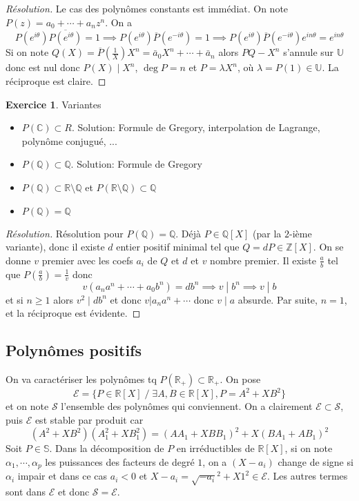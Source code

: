 \documentclass{article}
\theoremstyle{definition}
\newtheorem*{exo}{Exercice}
\begin{document}
\begin{proof}[Résolution]
    Le cas des polynômes constants est immédiat. On note $P(z)=a_0+\cdots +a_nz^n$. On a \[
        P(e^{i\theta})\overline{P(e^{i\theta})}=1\implies P(e^{i\theta})\overline P(e^{-i\theta})=1 \implies P(e^{i\theta})\overline P(e^{-i\theta})e^{in\theta}=e^{in\theta}
    \]
    Si on note $Q(X)=\overline P\left(\frac1X\right)X^n=\bar a_0X^n+\cdots +\bar a_n$ alors $PQ-X^n$ s'annule sur $\mathbb U$ donc est nul donc $P(X)\;|\;X^n$, $\deg P=n$ et $P=\lambda X^n$, où $\lambda=P(1)\in\mathbb U$. La réciproque est claire.
\end{proof}

\begin{exo}
    Variantes \begin{itemize}
        \item $P(\mathbb C)\subset R$. Solution: Formule de Gregory, interpolation de Lagrange, polynôme conjugué, ...
        \item $P(\mathbb Q)\subset \mathbb Q$. Solution: Formule de Gregory
        \item $P(\mathbb Q)\subset \mathbb R\setminus \mathbb Q$ et $P(\mathbb R\setminus \mathbb Q)\subset \mathbb Q$
        \item $P(\mathbb Q)=\mathbb Q$
    \end{itemize}
\end{exo}

\begin{proof}[Résolution]
    Résolution pour $P(\mathbb Q)=\mathbb Q$. Déjà $P\in\mathbb Q[X]$ (par la $2$-ième variante), donc il existe $d$ entier positif minimal tel que $Q=dP\in\mathbb Z[X]$. On se donne $v$ premier avec les coefs $a_i$ de $Q$ et $d$ et $v$ nombre premier. Il existe $\frac ab$ tel que $P(\frac ab)=\frac1v$ donc \[
        v(a_na^n+\cdots +a_0b^n)=db^n \implies v\;|\; b^n\implies v\;|\; b
    \]
    et si $n\geq 1$ alors $v^2\;|\;db^n$ et donc $v|a_na^n+\cdots$ donc $v\;|\;a$ absurde. Par suite, $n=1$, et la réciproque est évidente.
\end{proof}

\subsection{Polynômes positifs}

On va caractériser les polynômes tq $P(\mathbb R_+)\subset \mathbb R_+$.
On pose \[
    \mathcal E=\{P\in\mathbb R[X] \;/\; \exists A, B\in\mathbb R[X], P=A^2+XB^2\}
\]
et on note $\mathcal S$ l'ensemble des polynômes qui conviennent. On a clairement $\mathcal E\subset \mathcal S$, puis $\mathcal E$ est stable par produit car \[
    (A^2+XB^2)(A_1^2+XB_1^2)=(AA_1+XBB_1)^2+X(BA_1+AB_1)^2
\]
Soit $P\in\mathbb S$. Dans la décomposition de $P$ en irréductibles de $\mathbb R[X]$, si on note $\alpha_1, \cdots, \alpha_p$ les puissances des facteurs de degré $1$, on a $(X-a_i)$ change de signe si $\alpha_i$ impair et dans ce cas $a_i<0$ et $X-a_i=\sqrt{-a_i}^2+X1^2\in\mathcal E$. Les autres termes sont dans $\mathcal E$ et donc $\mathcal S=\mathcal E$.
\end{document}
